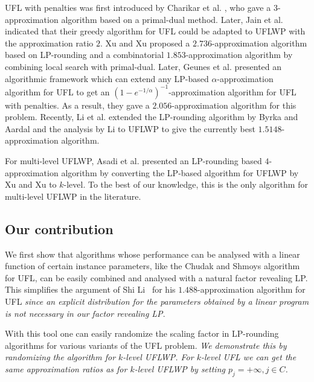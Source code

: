\documentclass{llncs}
\newcommand{\va}[1]{{\color{black}\sl  #1}}
\begin{document}
UFL with penalties was first introduced by Charikar et al. \cite{Charikar}, who gave a $3$-approximation algorithm based on a primal-dual method. Later, Jain et al. \cite{Jain} indicated that their greedy algorithm for UFL could be adapted to UFLWP with the approximation ratio $2$. Xu and Xu \cite{Xu:2005,Xu:2009} proposed a $2.736$-approximation algorithm based on LP-rounding and a combinatorial $1.853$-approximation algorithm by combining local search with primal-dual. Later, Geunes et al. \cite{Geunes} presented an algorithmic framework which can extend any LP-based $\alpha$-approximation algorithm for UFL to get an $(1-e^{-1/\alpha})^{-1}$-approximation algorithm for UFL with penalties. As a result, they gave a $2.056$-approximation algorithm for this problem. Recently, Li et al. \cite{YuLi} extended the LP-rounding algorithm by Byrka and Aardal \cite{Byrka} and the analysis by Li \cite{ShiLi} to UFLWP to give the currently best $1.5148$-approximation algorithm.

For multi-level UFLWP, Asadi et al. \cite{Asadi} presented an LP-rounding based $4$-approximation algorithm by converting the LP-based algorithm for UFLWP by Xu and Xu \cite{Xu:2005} to $k$-level. To the best of our knowledge, this is the only algorithm for multi-level UFLWP in the literature.

\subsection{Our contribution}

We first show that algorithms whose performance can be analysed with a linear function of certain instance parameters, like the Chudak and Shmoys algorithm \cite{Chudak} for UFL, can be easily combined and analysed with a natural factor revealing LP. This simplifies the argument of Shi Li~\cite{ShiLi} for his $1.488$-approximation algorithm for UFL \va{since an explicit distribution for the parameters obtained by a linear program is not necessary in our factor revealing LP}.

With this tool one can easily randomize the scaling factor in LP-rounding algorithms for various variants of the UFL problem. \va{We demonstrate this by randomizing the algorithm for $k$-level UFLWP. For $k$-level UFL we can get the same approximation ratios as for $k$-level UFLWP by setting $p_j=+\infty, j\in C$.}
\end{document}
